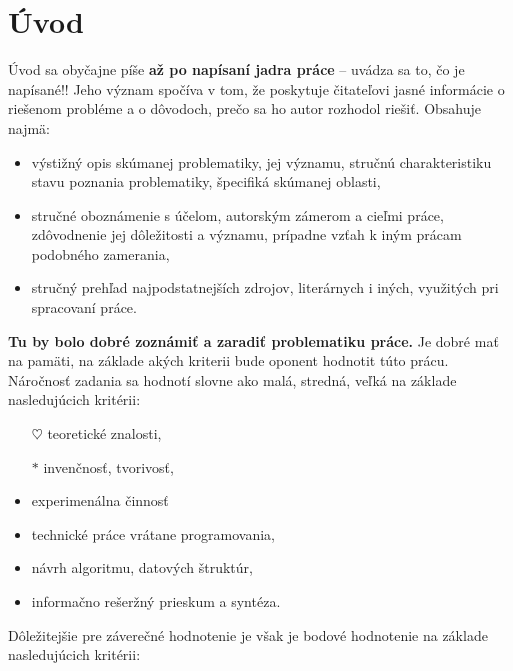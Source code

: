 
\chapter{Úvod}

Úvod sa obyčajne píše \textbf{až po napísaní jadra práce} – uvádza sa to, čo je napísané!! Jeho význam spočíva v tom, že poskytuje čitateľovi jasné informácie o riešenom probléme a o dôvodoch, prečo sa ho autor rozhodol riešiť. Obsahuje najmä:
\begin{itemize}
\item  výstižný opis skúmanej problematiky, jej významu, stručnú charakteristiku stavu poznania problematiky, špecifiká skúmanej oblasti,
\end{itemize}
\begin{itemize}
\item  stručné oboznámenie s účelom, autorským zámerom a cieľmi práce, zdôvodnenie jej dôležitosti a významu, prípadne vzťah k iným prácam podobného zamerania,
\end{itemize}
\begin{itemize}
\item  stručný prehľad najpodstatnejších zdrojov, literárnych i iných, využitých pri spracovaní práce.
\end{itemize}


\textbf{\textbf{Tu by bolo dobré zoznámiť a zaradiť problematiku práce. 
}}Je dobré mať na pamäti, na základe akých kriterii bude oponent hodnotit túto prácu. 
Náročnosť zadania sa hodnotí slovne ako  malá, stredná, veľká na základe nasledujúcich kritérii:

\begin{itemize}

\item[$\heartsuit$]{teoretické znalosti,}

\item[$\ast$]{invenčnosť, tvorivosť,}

\item{experimenálna činnosť}

\item{technické práce vrátane programovania,}

\item{návrh algoritmu, datových štruktúr,}

\item{informačno rešeržný prieskum a syntéza.}

\end{itemize}

Dôležitejšie pre záverečné hodnotenie je však je bodové hodnotenie 
na základe nasledujúcich kritérii:

